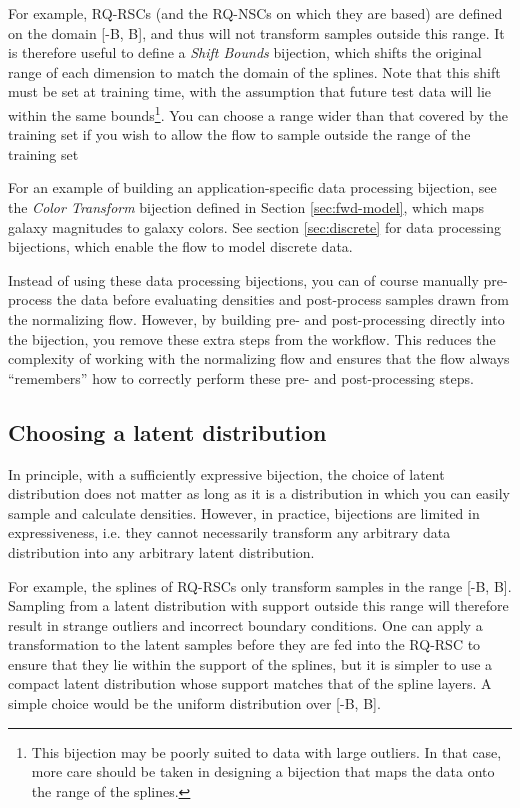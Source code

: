 \documentclass[twocolumn]{aastex631}
\begin{document}
For example, RQ-RSCs (and the RQ-NSCs on which they are based) are defined on the domain [-B, B], and thus will not transform samples outside this range.
It is therefore useful to define a \emph{Shift Bounds} bijection, which shifts the original range of each dimension to match the domain of the splines.
Note that this shift must be set at training time, with the assumption that future test data will lie within the same bounds\footnote{This bijection may be poorly suited to data with large outliers. In that case, more care should be taken in designing a bijection that maps the data onto the range of the splines.}.
You can choose a range wider than that covered by the training set if you wish to allow the flow to sample outside the range of the training set

For an example of building an application-specific data processing bijection, see the \emph{Color Transform} bijection defined in Section \ref{sec:fwd-model}, which maps galaxy magnitudes to galaxy colors.
See section \ref{sec:discrete} for data processing bijections, which enable the flow to model discrete data.

Instead of using these data processing bijections, you can of course manually pre-process the data before evaluating densities and post-process samples drawn from the normalizing flow.
However, by building pre- and post-processing directly into the bijection, you remove these extra steps from the workflow.
This reduces the complexity of working with the normalizing flow and ensures that the flow always ``remembers'' how to correctly perform these pre- and post-processing steps.


\subsection{Choosing a latent distribution}
\label{sec:latent}

In principle, with a sufficiently expressive bijection, the choice of latent distribution does not matter as long as it is a distribution in which you can easily sample and calculate densities.
However, in practice, bijections are limited in expressiveness, i.e. they cannot necessarily transform any arbitrary data distribution into any arbitrary latent distribution.

For example, the splines of RQ-RSCs only transform samples in the range [-B, B].
Sampling from a latent distribution with support outside this range will therefore result in strange outliers and incorrect boundary conditions.
One can apply a transformation to the latent samples before they are fed into the RQ-RSC to ensure that they lie within the support of the splines, but it is simpler to use a compact latent distribution whose support matches that of the spline layers.
A simple choice would be the uniform distribution over [-B, B].
\end{document}
